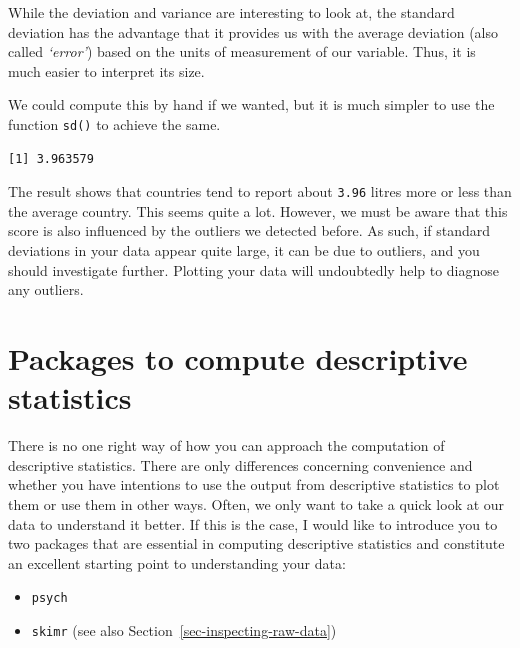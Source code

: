 \documentclass[
  letterpaper,
  DIV=11,
  numbers=noendperiod]{scrreprt}
\newenvironment{Shaded}{\begin{snugshade}}{\end{snugshade}}
\newcommand{\FunctionTok}[1]{\textcolor[rgb]{0.28,0.35,0.67}{#1}}
\newcommand{\NormalTok}[1]{\textcolor[rgb]{0.00,0.23,0.31}{#1}}
\newcommand{\SpecialCharTok}[1]{\textcolor[rgb]{0.37,0.37,0.37}{#1}}
\begin{document}
While the deviation and variance are interesting to look at, the
standard deviation has the advantage that it provides us with the
average deviation (also called \emph{`error'}) based on the units of
measurement of our variable. Thus, it is much easier to interpret its
size.

We could compute this by hand if we wanted, but it is much simpler to
use the function \texttt{sd()} to achieve the same.

\begin{Shaded}
\end{Shaded}

\begin{verbatim}
[1] 3.963579
\end{verbatim}

The result shows that countries tend to report about \texttt{3.96}
litres more or less than the average country. This seems quite a lot.
However, we must be aware that this score is also influenced by the
outliers we detected before. As such, if standard deviations in your
data appear quite large, it can be due to outliers, and you should
investigate further. Plotting your data will undoubtedly help to
diagnose any outliers.

\section{Packages to compute descriptive
statistics}\label{sec-packages-for-descriptive-statistics}

There is no one right way of how you can approach the computation of
descriptive statistics. There are only differences concerning
convenience and whether you have intentions to use the output from
descriptive statistics to plot them or use them in other ways. Often, we
only want to take a quick look at our data to understand it better. If
this is the case, I would like to introduce you to two packages that are
essential in computing descriptive statistics and constitute an
excellent starting point to understanding your data:

\begin{itemize}
\item
  \texttt{psych}
\item
  \texttt{skimr} (see also Section~\ref{sec-inspecting-raw-data})
\end{itemize}
\end{document}
